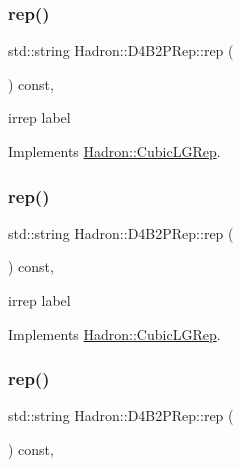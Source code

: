 \subsubsection{\texorpdfstring{rep()}{rep()}\hspace{0.1cm}{\footnotesize\ttfamily [1/3]}}
{\footnotesize\ttfamily std\+::string Hadron\+::\+D4\+B2\+P\+Rep\+::rep (\begin{DoxyParamCaption}{ }\end{DoxyParamCaption}) const\hspace{0.3cm}{\ttfamily [inline]}, {\ttfamily [virtual]}}

irrep label 

Implements \mbox{\hyperlink{structHadron_1_1CubicLGRep_a50f5ddbb8f4be4cee0106fa9e8c75e6c}{Hadron\+::\+Cubic\+L\+G\+Rep}}.

\mbox{\label{structHadron_1_1D4B2PRep_abe22fc63677217f78086bf135b443912}} 
\subsubsection{\texorpdfstring{rep()}{rep()}\hspace{0.1cm}{\footnotesize\ttfamily [2/3]}}
{\footnotesize\ttfamily std\+::string Hadron\+::\+D4\+B2\+P\+Rep\+::rep (\begin{DoxyParamCaption}{ }\end{DoxyParamCaption}) const\hspace{0.3cm}{\ttfamily [inline]}, {\ttfamily [virtual]}}

irrep label 

Implements \mbox{\hyperlink{structHadron_1_1CubicLGRep_a50f5ddbb8f4be4cee0106fa9e8c75e6c}{Hadron\+::\+Cubic\+L\+G\+Rep}}.

\mbox{\label{structHadron_1_1D4B2PRep_abe22fc63677217f78086bf135b443912}} 
\subsubsection{\texorpdfstring{rep()}{rep()}\hspace{0.1cm}{\footnotesize\ttfamily [3/3]}}
{\footnotesize\ttfamily std\+::string Hadron\+::\+D4\+B2\+P\+Rep\+::rep (\begin{DoxyParamCaption}{ }\end{DoxyParamCaption}) const\hspace{0.3cm}{\ttfamily [inline]}, {\ttfamily [virtual]}}

